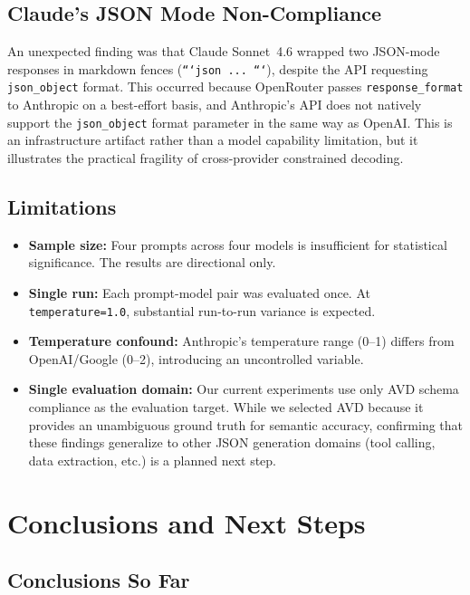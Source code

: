 \documentclass[11pt, letterpaper]{article}
\begin{document}
\subsection{Claude's JSON Mode Non-Compliance}
\label{sec:claude}

An unexpected finding was that Claude Sonnet~4.6 wrapped two JSON-mode responses in markdown fences (\texttt{```json ... ```}), despite the API requesting \texttt{json\_object} format. This occurred because OpenRouter passes \texttt{response\_format} to Anthropic on a best-effort basis, and Anthropic's API does not natively support the \texttt{json\_object} format parameter in the same way as OpenAI. This is an infrastructure artifact rather than a model capability limitation, but it illustrates the practical fragility of cross-provider constrained decoding.

\subsection{Limitations}
\label{sec:limitations}

\begin{itemize}[leftmargin=*]
    \item \textbf{Sample size:} Four prompts across four models is insufficient for statistical significance. The results are directional only.
    \item \textbf{Single run:} Each prompt-model pair was evaluated once. At \texttt{temperature=1.0}, substantial run-to-run variance is expected.
    \item \textbf{Temperature confound:} Anthropic's temperature range (0--1) differs from OpenAI/Google (0--2), introducing an uncontrolled variable.
    \item \textbf{Single evaluation domain:} Our current experiments use only AVD schema compliance as the evaluation target. While we selected AVD because it provides an unambiguous ground truth for semantic accuracy, confirming that these findings generalize to other JSON generation domains (tool calling, data extraction, etc.) is a planned next step.
\end{itemize}

\section{Conclusions and Next Steps}
\label{sec:conclusions}

\subsection{Conclusions So Far}
\end{document}
